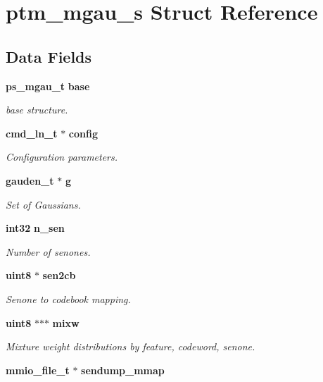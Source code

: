 \section{ptm\-\_\-mgau\-\_\-s \-Struct \-Reference}
\label{structptm__mgau__s}
\subsection*{\-Data \-Fields}
\begin{DoxyCompactItemize}
\item 
{\bf ps\-\_\-mgau\-\_\-t} {\bf base}
\begin{DoxyCompactList}\small\item\em base structure. \end{DoxyCompactList}\item 
{\bf cmd\-\_\-ln\-\_\-t} $\ast$ {\bf config}\label{structptm__mgau__s_aa9cd83ce89052bd6d112ecff54d118f9}

\begin{DoxyCompactList}\small\item\em \-Configuration parameters. \end{DoxyCompactList}\item 
{\bf gauden\-\_\-t} $\ast$ {\bf g}
\begin{DoxyCompactList}\small\item\em \-Set of \-Gaussians. \end{DoxyCompactList}\item 
{\bf int32} {\bf n\-\_\-sen}
\begin{DoxyCompactList}\small\item\em \-Number of senones. \end{DoxyCompactList}\item 
{\bf uint8} $\ast$ {\bf sen2cb}
\begin{DoxyCompactList}\small\item\em \-Senone to codebook mapping. \end{DoxyCompactList}\item 
{\bf uint8} $\ast$$\ast$$\ast$ {\bf mixw}\label{structptm__mgau__s_af0898f6d5b5b863901a4a4858a10d32a}

\begin{DoxyCompactList}\small\item\em \-Mixture weight distributions by feature, codeword, senone. \end{DoxyCompactList}\item 
{\bf mmio\-\_\-file\-\_\-t} $\ast$ {\bfseries sendump\-\_\-mmap}\label{structptm__mgau__s_a51e0c21f32dd4b13a3fcce320c71e375}


\end{DoxyCompactItemize}
